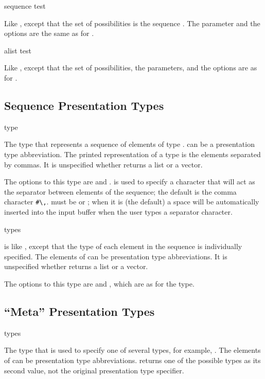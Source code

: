  {sequence \key test}

Like , except that the set of possibilities is the sequence
.  The parameter  and the options are the same as for
.


 {alist \key test}

Like , except that the set of possibilities, the parameters, and the
options are as for .


\subsection {Sequence Presentation Types}

 {type}

The type that represents a sequence of elements of type .  
can be a presentation type abbreviation.  The printed representation of a
 type is the elements separated by commas.  It is unspecified
whether  returns a list or a vector.

The options to this type are  and .
 is used to specify a character that will act as the separator
between elements of the sequence; the default is the comma character \verb+#\,+.
 must be  or ; when it is 
(the default) a space will be automatically inserted into the input buffer when
the user types a separator character.


 {\rest types}

 is like , except that the type of each
element in the sequence is individually specified.  The elements of 
can be presentation type abbreviations.  It is unspecified whether 
returns a list or a vector.

The options to this type are  and , which are as
for the  type.


\subsection {``Meta'' Presentation Types}

 {\rest types}

The type that is used to specify one of several types, for example, .  The elements of  can be presentation
type abbreviations.   returns one of the possible types as its second
value, not the original  presentation type specifier.


